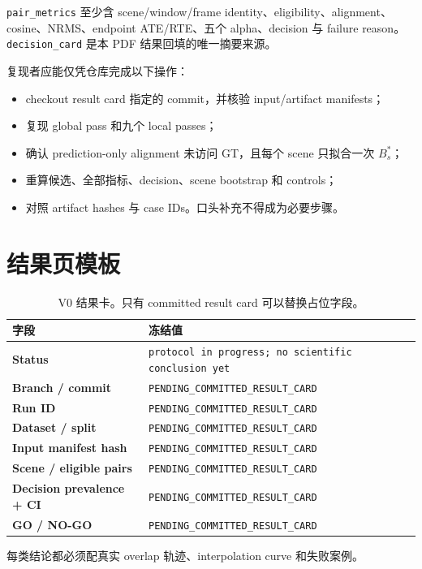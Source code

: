 \documentclass[UTF8,a4paper,11pt]{ctexart}
\begin{document}
\texttt{pair\_metrics} 至少含 scene/window/frame identity、eligibility、alignment、
cosine、NRMS、endpoint ATE/RTE、五个 alpha、decision 与 failure reason。
\texttt{decision\_card} 是本 PDF 结果回填的唯一摘要来源。

复现者应能仅凭仓库完成以下操作：
\begin{itemize}
  \item checkout result card 指定的 commit，并核验 input/artifact manifests；
  \item 复现 global pass 和九个 local passes；
  \item 确认 prediction-only alignment 未访问 GT，且每个 scene 只拟合一次 $B_s^*$；
  \item 重算候选、全部指标、decision、scene bootstrap 和 controls；
  \item 对照 artifact hashes 与 case IDs。口头补充不得成为必要步骤。
\end{itemize}

\section{结果页模板}

\begin{table}[htbp]
  \centering
  \small
  \begin{tabularx}{\textwidth}{>{\bfseries}p{4.2cm}X}
    \toprule
    字段 & 冻结值 \\
    \midrule
    Status & \texttt{protocol in progress; no scientific conclusion yet} \\
    Branch / commit & \texttt{PENDING\_COMMITTED\_RESULT\_CARD} \\
    Run ID & \texttt{PENDING\_COMMITTED\_RESULT\_CARD} \\
    Dataset / split & \texttt{PENDING\_COMMITTED\_RESULT\_CARD} \\
    Input manifest hash & \texttt{PENDING\_COMMITTED\_RESULT\_CARD} \\
    Scene / eligible pairs & \texttt{PENDING\_COMMITTED\_RESULT\_CARD} \\
    Decision prevalence + CI & \texttt{PENDING\_COMMITTED\_RESULT\_CARD} \\
    GO / NO-GO & \texttt{PENDING\_COMMITTED\_RESULT\_CARD} \\
    \bottomrule
  \end{tabularx}
  \caption{V0 结果卡。只有 committed result card 可以替换占位字段。}
\end{table}

每类结论都必须配真实 overlap 轨迹、interpolation curve 和失败案例。
\end{document}

